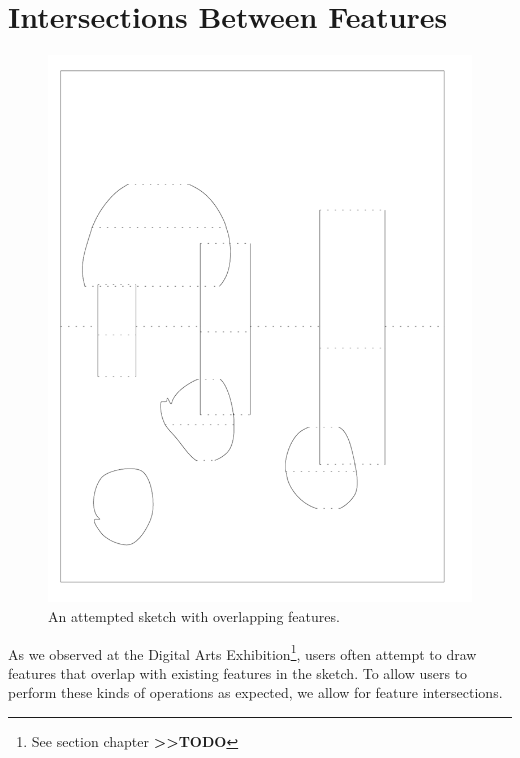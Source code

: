 \section{Intersections Between
Features}\label{intersections-between-features}

\begin{figure}[htbp]
\centering
\includegraphics{figures/91_Appendix_DAX_Creations/overlapping_features.png}
\caption{An attempted sketch with overlapping features.}
\end{figure}

As we observed at the Digital Arts Exhibition\footnote{See section
  chapter \textbf{\textgreater{}\textgreater{}TODO}}, users often
attempt to draw features that overlap with existing features in the
sketch. To allow users to perform these kinds of operations as expected,
we allow for feature intersections.

